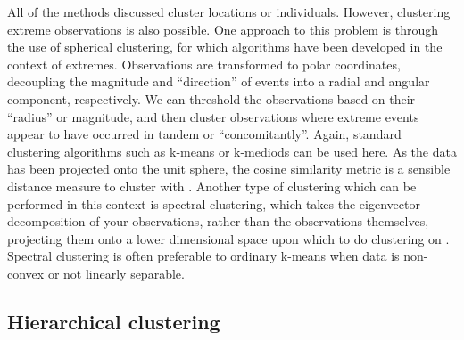 \documentclass{article}
\numberwithin{equation}{section}
\begin{document}
All of the methods discussed cluster locations or individuals. 
However, clustering extreme observations is also possible. 
One approach to this problem is through the use of spherical clustering, for which algorithms have been developed in the context of extremes.
Observations are transformed to polar coordinates, decoupling the magnitude and ``direction'' of events into a radial and angular component, respectively.
We can threshold the observations based on their ``radius'' or magnitude, and then cluster observations where extreme events appear to have occurred in tandem or ``concomitantly''.
Again, standard clustering algorithms such as k-means or k-mediods can be used here.
As the data has been projected onto the unit sphere, the cosine similarity metric is a sensible distance measure to cluster with \citep{Fomichov2022, Janen2020, deCarvalho2024}.
Another type of clustering which can be performed in this context is spectral clustering, which takes the eigenvector decomposition of your observations, rather than the observations themselves, projecting them onto a lower dimensional space upon which to do clustering on \citet{Ng2001, Vonluxburg2007}.
Spectral clustering is often preferable to ordinary k-means when data is non-convex or not linearly separable. 

\subsection{Hierarchical clustering}
\end{document}
